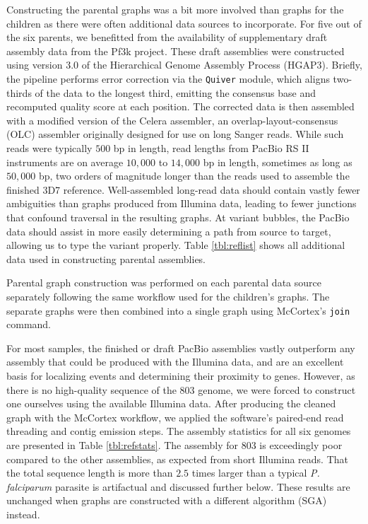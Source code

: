 Constructing the parental graphs was a bit more involved than graphs for the children as there were often additional data sources to incorporate.  For five out of the six parents, we benefitted from the availability of supplementary draft assembly data from the Pf3k project.  These draft assemblies were constructed using version $3.0$ of the Hierarchical Genome Assembly Process (HGAP$3$)\cite{Chin:2013iw}.  Briefly, the pipeline performs error correction via the \texttt{Quiver} module, which aligns two-thirds of the data to the longest third, emitting the consensus base and recomputed quality score at each position.  The corrected data is then assembled with a modified version of the Celera assembler\cite{Myers:1995vm}, an overlap-layout-consensus (OLC) assembler originally designed for use on long Sanger reads.  While such reads were typically $500$ bp in length, read lengths from PacBio RS II instruments are on average $10,000$ to $14,000$ bp in length, sometimes as long as $50,000$ bp, two orders of magnitude longer than the reads used to assemble the finished 3D7 reference.  Well-assembled long-read data should contain vastly fewer ambiguities than graphs produced from Illumina data, leading to fewer junctions that confound traversal in the resulting graphs.  At variant bubbles, the PacBio data should assist in more easily determining a path from source to target, allowing us to type the variant properly.  Table \ref{tbl:reflist} shows all additional data used in constructing parental assemblies.

Parental graph construction was performed on each parental data source separately following the same workflow used for the children's graphs.  The separate graphs were then combined into a single graph using McCortex's \texttt{join} command.

For most samples, the finished or draft PacBio assemblies vastly outperform any assembly that could be produced with the Illumina data, and are an excellent basis for localizing events and determining their proximity to genes.  However, as there is no high-quality sequence of the $803$ genome, we were forced to construct one ourselves using the available Illumina data.  After producing the cleaned graph with the McCortex workflow, we applied the software's paired-end read threading and contig emission steps.  The assembly statistics for all six genomes are presented in Table \ref{tbl:refstats}.  The assembly for $803$ is exceedingly poor compared to the other assemblies, as expected from short Illumina reads.  That the total sequence length is more than $2.5$ times larger than a typical \textit{P. falciparum} parasite is artifactual and discussed further below.  These results are unchanged when graphs are constructed with a different algorithm (SGA\cite{Simpson:2010fd}) instead.

